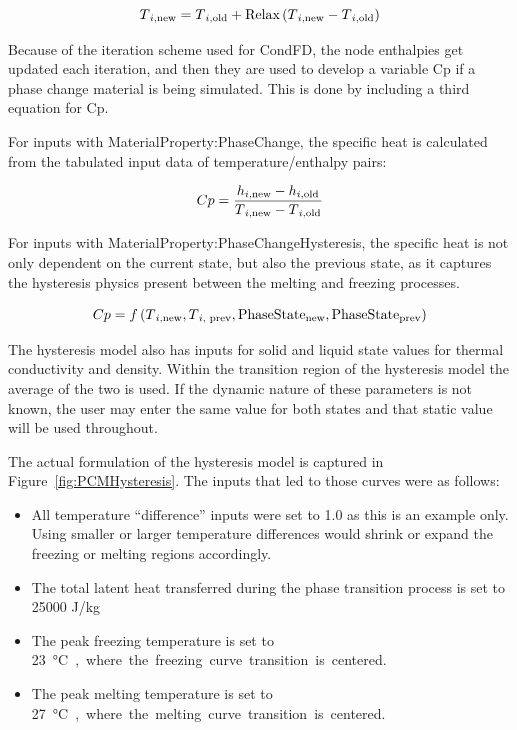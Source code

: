 \begin{equation}
T\textsubscript{$i$,new} = T\textsubscript{$i$,old}
                         + \text{Relax}\left(T\textsubscript{$i$,new}
                            - T\textsubscript{$i$,old} \right)
\end{equation}

Because of the iteration scheme used for CondFD, the node enthalpies get
updated each iteration, and then they are used to develop a variable Cp if a
phase change material is being simulated. This is done by including a third
equation for Cp.

For inputs with MaterialProperty:PhaseChange, the specific heat is calculated
from the tabulated input data of temperature/enthalpy pairs:

\begin{equation}
Cp = \frac{h\textsubscript{$i$,new} - h\textsubscript{$i$,old}}
          {T\textsubscript{$i$,new} - T\textsubscript{$i$,old}}
\end{equation}

For inputs with MaterialProperty:PhaseChangeHysteresis, the specific heat is not
only dependent on the current state, but also the previous state, as it captures
the hysteresis physics present between the melting and freezing processes.

\begin{equation}
Cp = f\left(T\textsubscript{$i$,new}, T\textsubscript{$i$, prev},
            \text{PhaseState}\textsubscript{new},
            \text{PhaseState}\textsubscript{prev}\right)
\end{equation}

The hysteresis model also has inputs for solid and liquid state values for
thermal conductivity and density.  Within the transition region of the
hysteresis model the average of the two is used.  If the dynamic nature of these
parameters is not known, the user may enter the same value for both states and
that static value will be used throughout.

The actual formulation of the hysteresis model is captured in
Figure~\ref{fig:PCMHysteresis}.  The inputs that led to those curves were as
follows:

\begin{itemize}
\item All temperature ``difference'' inputs were set to 1.0 as this is an
example only.  Using smaller or larger temperature differences would shrink or
expand the freezing or melting regions accordingly.
\item The total latent heat transferred during the phase transition process is
set to 25000 J/kg
\item The peak freezing temperature is set to \SI{23}\celsius, where the
freezing curve transition is centered.
\item The peak melting temperature is set to \SI{27}\celsius, where the
melting curve transition is centered.
\end{itemize}

